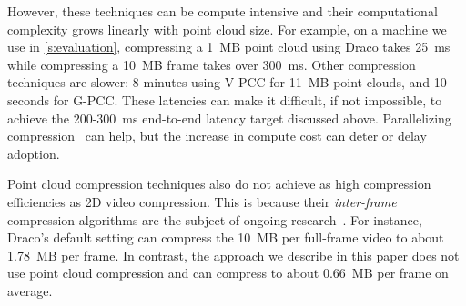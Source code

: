 However, these techniques can be compute intensive and their computational complexity grows linearly with point cloud size. %
%
%
For example, on a machine we use in \cref{s:evaluation}, compressing a 1~MB point cloud using Draco takes 25~ms while compressing a 10~MB frame takes over 300~ms.
%
Other compression techniques are slower: 8 minutes using V-PCC for 11~MB point clouds, and 10 seconds for G-PCC.
%
%
These latencies can make it difficult, if not impossible, to achieve the 200-300~ms end-to-end latency target discussed above.
%
Parallelizing compression~\cite{vivo,metastream,meshreduce} can help, but the increase in compute cost can deter or delay adoption. %
%

Point cloud compression techniques also do not achieve as high compression efficiencies as 2D video compression.
%
This is because their \textit{inter-frame} compression algorithms are the subject of ongoing research~\cite{pcc-future,hong2022motion,hong2022fractional}.
%
For instance, Draco's default setting can compress the 10~MB per full-frame video to about 1.78~MB per frame.
%
In contrast, the approach we describe in this paper does not use point cloud compression and can compress to about 0.66~MB per frame on average.


